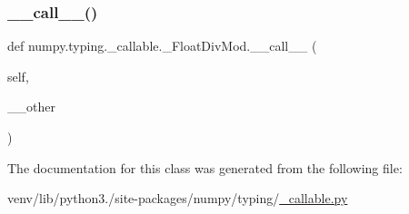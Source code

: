 \mbox{\label{classnumpy_1_1typing_1_1__callable_1_1__FloatDivMod_a5d8c4ef1bb9b8ec167e40a77f943a27f}} 
\subsubsection{\texorpdfstring{\+\_\+\+\_\+call\+\_\+\+\_\+()}{\_\_call\_\_()}\hspace{0.1cm}{\footnotesize\ttfamily [4/4]}}
{\footnotesize\ttfamily def numpy.\+typing.\+\_\+callable.\+\_\+\+Float\+Div\+Mod.\+\_\+\+\_\+call\+\_\+\+\_\+ (\begin{DoxyParamCaption}\item[{}]{self,  }\item[{}]{\+\_\+\+\_\+other }\end{DoxyParamCaption})}



The documentation for this class was generated from the following file\+:\begin{DoxyCompactItemize}
\item 
venv/lib/python3./site-\/packages/numpy/typing/\hyperlink{__callable_8py}{\+\_\+callable.\+py}\end{DoxyCompactItemize}

